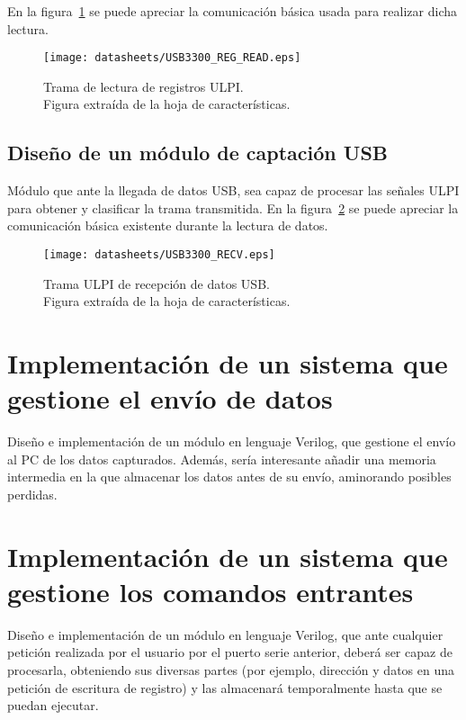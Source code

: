 En la figura~\ref{fig:ULPI_REG_READ} se puede apreciar la comunicación básica usada para realizar dicha lectura.
\begin{figure}[hbt]
    \centering
    \texttt{[image: datasheets/USB3300\_REG\_READ.eps]}
    \caption{Trama de lectura de registros ULPI. \\Figura extraída de la hoja de características.}
    \label{fig:ULPI_REG_READ}
\end{figure}

\subsection{Diseño de un módulo de captación USB}
Módulo que ante la llegada de datos USB, sea capaz de procesar las señales ULPI para obtener y clasificar la trama transmitida. En la figura~\ref{fig:ULPI_RECV} se puede apreciar la comunicación básica existente durante la lectura de datos.
\begin{figure}[hbt]
    \centering
    \texttt{[image: datasheets/USB3300\_RECV.eps]}
    \caption{Trama ULPI de recepción de datos USB. \\Figura extraída de la hoja de características.}
    \label{fig:ULPI_RECV}
\end{figure}



\section{Implementación de un sistema que gestione el envío de datos}
Diseño e implementación de un módulo en lenguaje Verilog, que gestione el envío al PC de los datos capturados. Además, sería interesante añadir una memoria intermedia en la que almacenar los datos antes de su envío, aminorando posibles perdidas.



\section{Implementación de un sistema que gestione los comandos entrantes}
Diseño e implementación de un módulo en lenguaje Verilog, que ante cualquier petición realizada por el usuario por el puerto serie anterior, deberá ser capaz de procesarla, obteniendo sus diversas partes (por ejemplo, dirección y datos en una petición de escritura de registro) y las almacenará temporalmente hasta que se puedan ejecutar.



